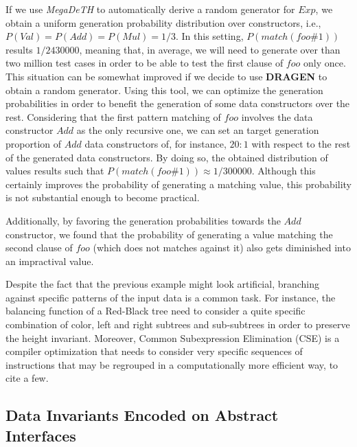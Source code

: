 \documentclass[conference]{IEEEtran}
\newcommand{\Conid}[1]{\mathit{#1}}
\newcommand{\Varid}[1]{\mathit{#1}}
\newcommand{\megadeth}{\emph{MegaDeTH}\xspace}
\newcommand{\dragen}{\textbf{DRAGEN}\xspace}
\begin{document}
If we use \megadeth to automatically derive a random generator for \ensuremath{\Conid{Exp}}, we
obtain a uniform generation probability distribution over constructors, i.e.,
$P(\ensuremath{\Conid{Val}}) = P(\ensuremath{\Conid{Add}}) = P(\ensuremath{\Conid{Mul}}) = 1/3$.
%
In this setting, $P(match(foo\#1))$ results $1/2430000$, meaning that, in
average, we will need to generate over than two million test cases in order to
be able to test the first clause of \ensuremath{\Varid{foo}} only once.
%
This situation can be somewhat improved if we decide to use \dragen to obtain a
random generator.
%
Using this tool, we can optimize the generation probabilities in order to
benefit the generation of some data constructors over the rest.
%
Considering that the first pattern matching of \ensuremath{\Varid{foo}} involves the data
constructor \ensuremath{\Conid{Add}} as the only recursive one, we can set an target generation
proportion of \ensuremath{\Conid{Add}} data constructors of, for instance, $20:1$ with respect to
the rest of the generated data constructors.
%
By doing so, the obtained distribution of values results such that
$P(match(foo\#1)) \approx 1/300000$.
%
Although this certainly improves the probability of generating a matching value,
this probability is not substantial enough to become practical.


Additionally, by favoring the generation probabilities towards the \ensuremath{\Conid{Add}}
constructor, we found that the probability of generating a value matching the
second clause of \ensuremath{\Varid{foo}} (which does not matches against it) also gets diminished
into an impractival value.


Despite the fact that the previous example might look artificial, branching
against specific patterns of the input data is a common task.
%
For instance, the balancing function of a Red-Black tree need to consider a
quite specific combination of color, left and right subtrees and sub-subtrees
in order to preserve the height invariant.
%
Moreover, Common Subexpression Elimination (CSE) is a compiler optimization that
needs to consider very specific sequences of instructions that may be regrouped
in a computationally more efficient way, to cite a few.



\subsection{\textbf{Data Invariants Encoded on Abstract Interfaces}}
\end{document}
